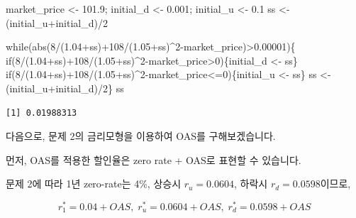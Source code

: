 \documentclass[
  a4paper,
  DIV=11,
  numbers=noendperiod]{scrreprt}
\newenvironment{Shaded}{\begin{snugshade}}{\end{snugshade}}
\newcommand{\ControlFlowTok}[1]{\textcolor[rgb]{0.00,0.23,0.31}{#1}}
\newcommand{\DecValTok}[1]{\textcolor[rgb]{0.68,0.00,0.00}{#1}}
\newcommand{\FloatTok}[1]{\textcolor[rgb]{0.68,0.00,0.00}{#1}}
\newcommand{\FunctionTok}[1]{\textcolor[rgb]{0.28,0.35,0.67}{#1}}
\newcommand{\NormalTok}[1]{\textcolor[rgb]{0.00,0.23,0.31}{#1}}
\newcommand{\OtherTok}[1]{\textcolor[rgb]{0.00,0.23,0.31}{#1}}
\newcommand{\SpecialCharTok}[1]{\textcolor[rgb]{0.37,0.37,0.37}{#1}}
\begin{document}
\begin{Shaded}
\begin{Highlighting}[]
\NormalTok{market\_price }\OtherTok{\textless{}{-}} \FloatTok{101.9}\NormalTok{; initial\_d }\OtherTok{\textless{}{-}} \FloatTok{0.001}\NormalTok{; initial\_u }\OtherTok{\textless{}{-}} \FloatTok{0.1}
\NormalTok{ss }\OtherTok{\textless{}{-}}\NormalTok{ (initial\_u}\SpecialCharTok{+}\NormalTok{initial\_d)}\SpecialCharTok{/}\DecValTok{2}

\ControlFlowTok{while}\NormalTok{(}\FunctionTok{abs}\NormalTok{(}\DecValTok{8}\SpecialCharTok{/}\NormalTok{(}\FloatTok{1.04}\SpecialCharTok{+}\NormalTok{ss)}\SpecialCharTok{+}\DecValTok{108}\SpecialCharTok{/}\NormalTok{(}\FloatTok{1.05}\SpecialCharTok{+}\NormalTok{ss)}\SpecialCharTok{\^{}}\DecValTok{2}\SpecialCharTok{{-}}\NormalTok{market\_price)}\SpecialCharTok{\textgreater{}}\FloatTok{0.00001}\NormalTok{)\{}
  \ControlFlowTok{if}\NormalTok{(}\DecValTok{8}\SpecialCharTok{/}\NormalTok{(}\FloatTok{1.04}\SpecialCharTok{+}\NormalTok{ss)}\SpecialCharTok{+}\DecValTok{108}\SpecialCharTok{/}\NormalTok{(}\FloatTok{1.05}\SpecialCharTok{+}\NormalTok{ss)}\SpecialCharTok{\^{}}\DecValTok{2}\SpecialCharTok{{-}}\NormalTok{market\_price}\SpecialCharTok{\textgreater{}}\DecValTok{0}\NormalTok{)\{initial\_d }\OtherTok{\textless{}{-}}\NormalTok{ ss\}}
  \ControlFlowTok{if}\NormalTok{(}\DecValTok{8}\SpecialCharTok{/}\NormalTok{(}\FloatTok{1.04}\SpecialCharTok{+}\NormalTok{ss)}\SpecialCharTok{+}\DecValTok{108}\SpecialCharTok{/}\NormalTok{(}\FloatTok{1.05}\SpecialCharTok{+}\NormalTok{ss)}\SpecialCharTok{\^{}}\DecValTok{2}\SpecialCharTok{{-}}\NormalTok{market\_price}\SpecialCharTok{\textless{}=}\DecValTok{0}\NormalTok{)\{initial\_u }\OtherTok{\textless{}{-}}\NormalTok{ ss\}}
\NormalTok{  ss }\OtherTok{\textless{}{-}}\NormalTok{ (initial\_u}\SpecialCharTok{+}\NormalTok{initial\_d)}\SpecialCharTok{/}\DecValTok{2}\NormalTok{\}}
\NormalTok{ss}
\end{Highlighting}
\end{Shaded}

\begin{verbatim}
[1] 0.01988313
\end{verbatim}

다음으로, 문제 2의 금리모형을 이용하여 OAS를 구해보겠습니다.

먼저, OAS를 적용한 할인율은 zero rate + OAS로 표현할 수 있습니다.

문제 2에 따라 1년 zero-rate는 4\%, 상승시 \(r_u=0.0604\), 하락시
\(r_d=0.0598\)이므로,

\[r^*_1=0.04+OAS,\;r^*_u=0.0604+OAS,\;r_d^*=0.0598+OAS\]
\end{document}
